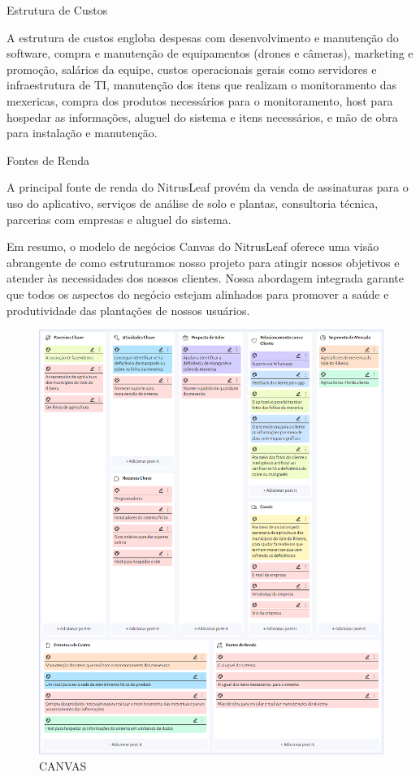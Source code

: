 \documentclass[
  a4paper,%
  12pt,%
  english,%
  brazilian,%
]{article}
\begin{document}
Estrutura de Custos

A estrutura de custos engloba despesas com desenvolvimento e manutenção do software, compra e manutenção de equipamentos (drones e câmeras), marketing e promoção, salários da equipe, custos operacionais gerais como servidores e infraestrutura de TI, manutenção dos itens que realizam o monitoramento das mexericas, compra dos produtos necessários para o monitoramento, host para hospedar as informações, aluguel do sistema e itens necessários, e mão de obra para instalação e manutenção.

Fontes de Renda

A principal fonte de renda do NitrusLeaf provém da venda de assinaturas para o uso do aplicativo, serviços de análise de solo e plantas, consultoria técnica, parcerias com empresas e aluguel do sistema.

Em resumo, o modelo de negócios Canvas do NitrusLeaf oferece uma visão abrangente de como estruturamos nosso projeto para atingir nossos objetivos e atender às necessidades dos nossos clientes. Nossa abordagem integrada garante que todos os aspectos do negócio estejam alinhados para promover a saúde e produtividade das plantações de nossos usuários.

\begin{figure}[H]
\centering
\caption{CANVAS}%
\label{fig:canvas}
\includegraphics[width=0.8\linewidth]{Logos/canvas.png}
\end{figure}
\end{document}

